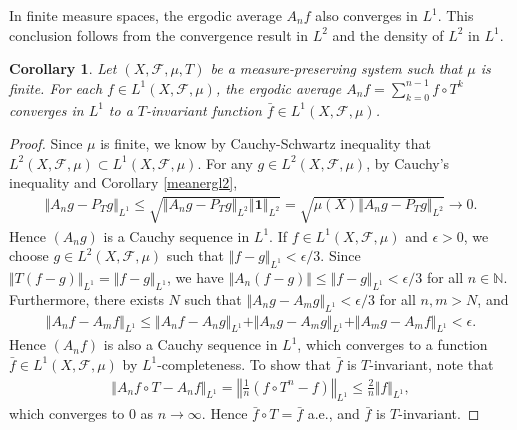 \documentclass{article}
\numberwithin{equation}{section}
\newcommand{\bbN}{\mathbb{N}}
\newcommand{\scr}{\mathscr}
\theoremstyle{plain}
\newtheorem{corollary}[theorem]{Corollary}
\theoremstyle{definition}
\begin{document}
In finite measure spaces, the ergodic average $A_nf$ also converges in $L^1$. This conclusion follows from the convergence result in $L^2$ and the density of $L^2$ in $L^1$.
\begin{corollary}\label{meanergl1}
Let $(X,\scr{F},\mu,T)$ be a measure-preserving system such that $\mu$ is finite. For each $f\in L^1(X,\scr{F},\mu)$, the ergodic average $A_nf=\sum_{k=0}^{n-1}f\circ T^k$ converges in $L^1$ to a $T$-invariant function $\bar{f}\in L^1(X,\scr{F},\mu)$.
\end{corollary}
\begin{proof}
Since $\mu$ is finite, we know by Cauchy-Schwartz inequality that $L^2(X,\scr{F},\mu)\subset L^1(X,\scr{F},\mu)$. For any $g\in L^2(X,\scr{F},\mu)$, by Cauchy's inequality and Corollary \ref{meanergl2}, 
\begin{align*}
	\Vert A_n g-P_Tg\Vert_{L^1}\leq\sqrt{\Vert A_n g-P_Tg\Vert_{L^2}\left\Vert\mathbf{1}\right\Vert_{L^2}}=\sqrt{\mu(X)\Vert A_n g-P_Tg\Vert_{L^2}}\to 0.
\end{align*}
Hence $(A_ng)$ is a Cauchy sequence in $L^1$. If $f\in L^1(X,\scr{F},\mu)$ and $\epsilon>0$, we choose $g\in L^2(X,\scr{F},\mu)$ such that $\Vert f-g\Vert_{L^1}<\epsilon/3$. Since $\Vert T(f-g)\Vert_{L^1}=\Vert f-g\Vert_{L^1}$, we have $\Vert A_n(f-g)\Vert\leq\Vert f-g\Vert_{L^1}<\epsilon/3$ for all $n\in\bbN$. Furthermore, there exists $N$ such that $\Vert A_ng-A_mg\Vert_{L^1}<\epsilon/3$ for all $n,m>N$, and
\begin{align*}
	\Vert A_n f-A_m f\Vert_{L^1}\leq\Vert A_n f-A_n g\Vert_{L^1}+\Vert A_n g-A_m g\Vert_{L^1}+\Vert A_m g-A_m f\Vert_{L^1}<\epsilon.
\end{align*}
Hence $(A_nf)$ is also a Cauchy sequence in $L^1$, which converges to a function $\bar{f}\in L^1(X,\scr{F},\mu)$ by $L^1$-completeness. To show that $\bar{f}$ is $T$-invariant, note that
\begin{align*}
	\Vert A_nf\circ T-A_nf\Vert_{L^1}=\left\Vert\frac{1}{n}\left(f\circ T^n-f\right)\right\Vert_{L^1}\leq\frac{2}{n}\Vert f\Vert_{L^1},
\end{align*}
which converges to $0$ as $n\to\infty$. Hence $\bar{f}\circ T=\bar{f}$ a.e., and $\bar{f}$ is $T$-invariant.
\end{proof}
\end{document}
